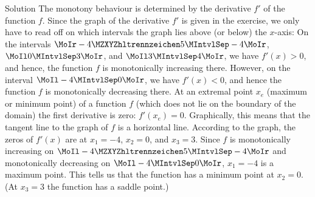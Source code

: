 \begin{MExercises}
\begin{MExercise}
\begin{MHint}{Solution}
 The monotony behaviour is determined by the derivative $f'$ of the function $f$. Since the graph of 
 the derivative $f'$ is given in the exercise, we only have to read off on which intervals the graph 
 lies above (or below) the $x$-axis: On the intervals $\MoIr -\MZahl{4}{5} \MIntvlSep -4\MoIr$, $\MoIl 0 \MIntvlSep 3\MoIr$,
 and $\MoIl 3 \MIntvlSep 4\MoIr$, we have $f'(x) > 0$, and hence, the function $f$ is monotonically increasing there.
 However, on the interval $\MoIl -4 \MIntvlSep 0\MoIr$, we have $f'(x) < 0$, and hence the function $f$ is 
 monotonically decreasing there.\newline
 At an extremal point $x_e$ (maximum or minimum point) of a function $f$ (which does not lie on the boundary of the 
 domain) the first derivative is zero: $f'(x_e) = 0$. Graphically, this means that the tangent line to the graph of 
 $f$ is a horizontal line. According to the graph, the zeros of $f'(x)$ are at $x_ 1 = -4$, $x_2 = 0$, and $x_3 = 3$.
 Since $f$ is monotonically increasing on $\MoIl -\MZahl{4}{5} \MIntvlSep -4\MoIr$ and monotonically decreasing on
 $\MoIl -4 \MIntvlSep 0\MoIr$, $x_1 = - 4$ is a maximum point. This tells us that the function 
 has a minimum point at $x_2 = 0$. (At $x_3 = 3$ the function has a saddle point.)
\end{MHint}
\end{MExercise}
\end{MExercises}



